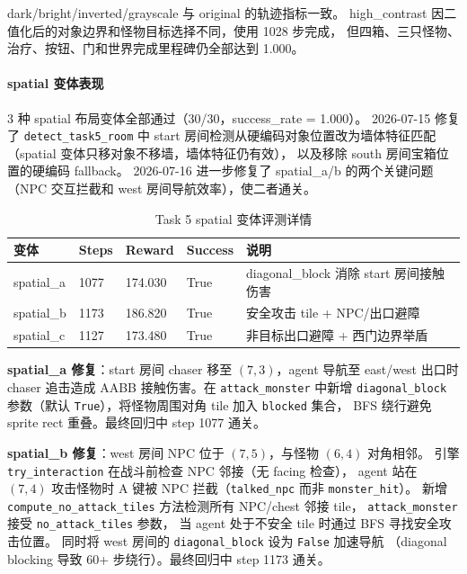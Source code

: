 \documentclass[12pt,a4paper]{ctexart}
\begin{document}
dark/bright/inverted/grayscale 与 original 的轨迹指标一致。
high\_contrast 因二值化后的对象边界和怪物目标选择不同，使用 1028 步完成，
但四箱、三只怪物、治疗、按钮、门和世界完成里程碑仍全部达到 1.000。

\paragraph{spatial 变体表现}

3 种 spatial 布局变体全部通过（30/30，success\_rate = 1.000）。
2026-07-15 修复了 \texttt{detect\_task5\_room}
中 start 房间检测从硬编码对象位置改为墙体特征匹配
（spatial 变体只移对象不移墙，墙体特征仍有效），
以及移除 south 房间宝箱位置的硬编码 fallback。
2026-07-16 进一步修复了 spatial\_a/b 的两个关键问题
（NPC 交互拦截和 west 房间导航效率），使二者通关。

\begin{table}[H]
\centering
\begin{tabular}{p{}p{}p{}p{}p{}}
\toprule
变体 & Steps & Reward & Success & 说明 \\
\midrule
spatial\_a & 1077 & 174.030 & True & diagonal\_block 消除 start 房间接触伤害 \\
spatial\_b & 1173 & 186.820 & True & 安全攻击 tile + NPC/出口避障 \\
spatial\_c & 1127 & 173.480 & True & 非目标出口避障 + 西门边界举盾 \\
\bottomrule
\end{tabular}
\caption{Task 5 spatial 变体评测详情}
\label{tab:task5-spatial}
\end{table}

\textbf{spatial\_a 修复}：start 房间 chaser 移至 $(7,3)$，agent 导航至 east/west 出口时
chaser 追击造成 AABB 接触伤害。在 \texttt{attack\_monster} 中新增 \texttt{diagonal\_block}
参数（默认 \texttt{True}），将怪物周围对角 tile 加入 \texttt{blocked} 集合，
BFS 绕行避免 sprite rect 重叠。最终回归中 step 1077 通关。

\textbf{spatial\_b 修复}：west 房间 NPC 位于 $(7,5)$，与怪物 $(6,4)$ 对角相邻。
引擎 \texttt{try\_interaction} 在战斗前检查 NPC 邻接（无 facing 检查），
agent 站在 $(7,4)$ 攻击怪物时 A 键被 NPC 拦截（\texttt{talked\_npc} 而非 \texttt{monster\_hit}）。
新增 \texttt{compute\_no\_attack\_tiles} 方法检测所有 NPC/chest 邻接 tile，
\texttt{attack\_monster} 接受 \texttt{no\_attack\_tiles} 参数，
当 agent 处于不安全 tile 时通过 BFS 寻找安全攻击位置。
同时将 west 房间的 \texttt{diagonal\_block} 设为 \texttt{False} 加速导航
（diagonal blocking 导致 60+ 步绕行）。最终回归中 step 1173 通关。
\end{document}

